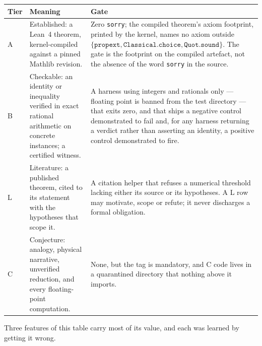\documentclass[11pt]{article}
\newcommand{\tier}[1]{\textsf{#1}}
\begin{document}
\begin{center}
\small
\begin{tabular}{@{}p{1.6cm}p{5.6cm}p{7.6cm}@{}}
\toprule
\textbf{Tier} & \textbf{Meaning} & \textbf{Gate} \\
\midrule
\tier{A} & Established: a Lean~4 theorem, kernel-compiled against a pinned Mathlib revision. &
Zero \texttt{sorry}; the compiled theorem's axiom footprint, printed by the kernel, names no
axiom outside $\{\texttt{propext},\texttt{Classical.choice},\texttt{Quot.sound}\}$. The gate is
the footprint on the compiled artefact, not the absence of the word \texttt{sorry} in the
source. \\
\tier{B} & Checkable: an identity or inequality verified in exact rational arithmetic on
concrete instances; a certified witness. & A harness using integers and rationals only ---
floating point is banned from the test directory --- that exits zero, and that ships a negative
control demonstrated to fail and, for any harness returning a verdict rather than asserting an
identity, a positive control demonstrated to fire. \\
\tier{L} & Literature: a published theorem, cited to its statement with the hypotheses that
scope it. & A citation helper that refuses a numerical threshold lacking either its source or
its hypotheses. A \tier{L} row may motivate, scope or refute; it never discharges a formal
obligation. \\
\tier{C} & Conjecture: analogy, physical narrative, unverified reduction, and every
floating-point computation. & None, but the tag is mandatory, and \tier{C} code lives in a
quarantined directory that nothing above it imports. \\
\bottomrule
\end{tabular}
\end{center}

Three features of this table carry most of its value, and each was learned by getting it wrong.
\end{document}
